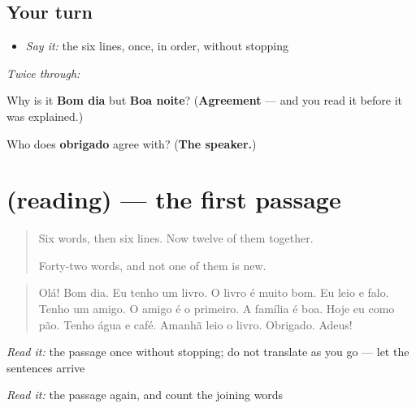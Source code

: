 \subsection*{Your turn}
\begin{itemize}
\raggedright
  \item \emph{Say it:} the six lines, once, in order, without stopping
\end{itemize}

\emph{Twice through:}

\begin{tcolorbox}[breakable,colback=teal!4,colframe=teal!35!black,title={Before you move on}]
Why is it \textbf{Bom dia} but \textbf{Boa noite}? (\textbf{Agreement} — and you read it before it was explained.)

Who does \textbf{obrigado} agree with? (\textbf{The speaker.})
\end{tcolorbox}
\section[(reading)]{(reading) — the first passage}

\label{lesson:PT-C29-primeira-leitura}



\begin{quote}
Six words, then six lines. Now twelve of them together.

Forty-two words, and not one of them is new.
\end{quote}

\begin{tcolorbox}[breakable,skin=enhanced,colback=orange!6,colframe=orange!45!black,boxrule=0.5pt,arc=1mm,left=6pt,right=6pt,top=4pt,bottom=4pt,fonttitle=\bfseries,title={Read this}]
\begin{quote}
Olá! Bom dia. Eu tenho um livro. O livro é muito bom. Eu leio e falo. Tenho um amigo. O amigo é o primeiro. A família é boa. Hoje eu como pão. Tenho água e café. Amanhã leio o livro. Obrigado. Adeus!
\end{quote}

\emph{Read it:} the passage once without stopping; do not translate as you go — let the sentences arrive

\emph{Read it:} the passage again, and count the joining words
\end{tcolorbox}


